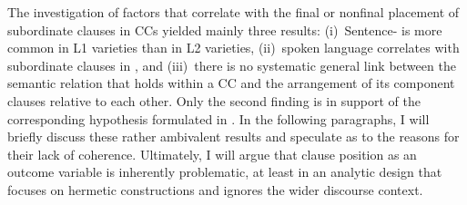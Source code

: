 The investigation of factors that correlate with the final or nonfinal placement of subordinate clauses in CCs yielded mainly three results:
(i)~Sentence- is more common in L1 varieties than in L2 varieties,
(ii)~spoken language correlates with subordinate clauses in , and
(iii)~there is no systematic general link between the semantic relation that holds within a CC and the arrangement of its component clauses relative to each other. Only the second finding is in support of the corresponding hypothesis formulated in . In the following paragraphs, I will briefly discuss these rather ambivalent results and speculate as to the reasons for their lack of coherence. Ultimately, I will argue that clause position as an outcome variable is inherently problematic, at least in an analytic design that focuses on hermetic constructions and ignores the wider discourse context.

